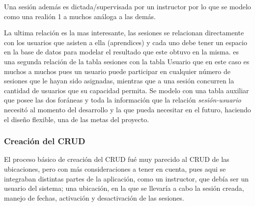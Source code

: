 Una sesión además es dictada/supervisada por un instructor por lo que se modelo como una realión 1 a muchos análoga a las demás.

La ultima relación es la mas interesante, las sesiones se relacionan directamente con los usuarios que asisten a ella (aprendices) y cada uno debe tener un espacio en la base de datos para modelar el resultado que este obtuvo en la misma. es una segunda relación de la tabla sesiones con la tabla Usuario que en este caso es muchos a muchos pues un usuario puede participar en cualquier número de sesiones que le hayan sido asignadas, mientras que a una sesión concurren la cantidad de usuarios que su capacidad permita. Se modelo con una tabla auxiliar que posee las dos foráneas y toda la información que la relación \emph{sesión-usuario} necesitó al momento del desarrollo y la que pueda necesitar en el futuro, haciendo el diseño flexible, una de las metas del proyecto.

\subsubsection{Creación del CRUD}

El proceso básico de creación del CRUD fué muy parecido al CRUD de las ubicaciones, pero con más consideraciones a tener en cuenta, pues aqui se integraban distintas partes de la aplicación, como un instructor, que debía ser un usuario del sistema; una ubicación, en la que se llevaría a cabo la sesión creada, manejo de fechas, activación y desactivación de las sesiones.


